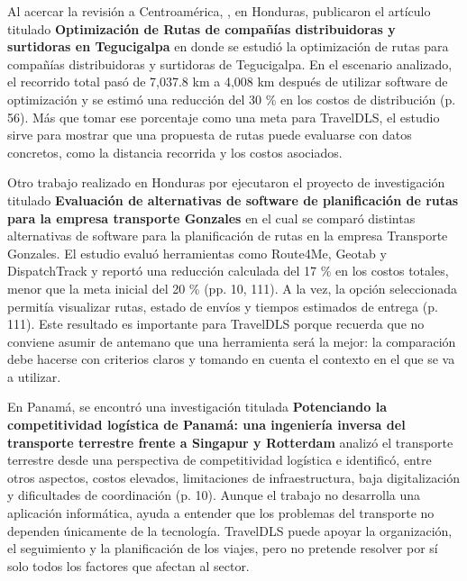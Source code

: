\label{ant:aguilar}
Al acercar la revisión a Centroamérica, \textcite{aguilar2022optimizacion}, en Honduras, publicaron el artículo titulado \textbf{Optimización de Rutas de compañías distribuidoras y surtidoras en Tegucigalpa} en donde se estudió la optimización de rutas para compañías distribuidoras y surtidoras de Tegucigalpa. En el escenario analizado, el recorrido total pasó de 7,037.8 km a 4,008 km después de utilizar software de optimización y se estimó una reducción del 30 \% en los costos de distribución (p. 56). Más que tomar ese porcentaje como una meta para TravelDLS, el estudio sirve para mostrar que una propuesta de rutas puede evaluarse con datos concretos, como la distancia recorrida y los costos asociados.

\label{ant:hernandez}
Otro trabajo realizado en Honduras por \textcite{hernandez2024evaluacion} ejecutaron el proyecto de investigación titulado \textbf{Evaluación de alternativas de software de planificación de rutas para la empresa transporte Gonzales} en el cual se comparó distintas alternativas de software para la planificación de rutas en la empresa Transporte Gonzales. El estudio evaluó herramientas como Route4Me, Geotab y DispatchTrack y reportó una reducción calculada del 17 \% en los costos totales, menor que la meta inicial del 20 \% (pp. 10, 111). A la vez, la opción seleccionada permitía visualizar rutas, estado de envíos y tiempos estimados de entrega (p. 111). Este resultado es importante para TravelDLS porque recuerda que no conviene asumir de antemano que una herramienta será la mejor: la comparación debe hacerse con criterios claros y tomando en cuenta el contexto en el que se va a utilizar.

En Panamá, \textcite{castillo2025potenciando} se encontró una investigación titulada \textbf{Potenciando la competitividad logística de Panamá: una ingeniería inversa del transporte terrestre frente a Singapur y Rotterdam} analizó el transporte terrestre desde una perspectiva de competitividad logística e identificó, entre otros aspectos, costos elevados, limitaciones de infraestructura, baja digitalización y dificultades de coordinación (p. 10). Aunque el trabajo no desarrolla una aplicación informática, ayuda a entender que los problemas del transporte no dependen únicamente de la tecnología. TravelDLS puede apoyar la organización, el seguimiento y la planificación de los viajes, pero no pretende resolver por sí solo todos los factores que afectan al sector.

